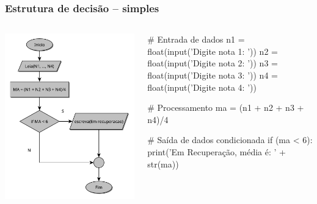 \documentclass{beamer}
\begin{document}
\begin{frame}[fragile]
\frametitle{Estrutura de decisão -- simples}

\begin{columns}
	\begin{column}{0.5\textwidth}		
		\center \includegraphics[scale=0.4]{./figures/media-if-simple.pdf}
	\end{column}
	
	\begin{column}{0.5\textwidth}  %
\begin{python}
# Entrada de dados
n1 = float(input('Digite nota 1: '))
n2 = float(input('Digite nota 2: '))
n3 = float(input('Digite nota 3: '))
n4 = float(input('Digite nota 4: '))

# Processamento
ma = (n1 + n2 + n3 + n4)/4

# Saída de dados condicionada
if (ma < 6):
    print('Em Recuperação, média é: ' + str(ma))
\end{python}  
	\end{column}
\end{columns}
\end{frame}
\end{document}
